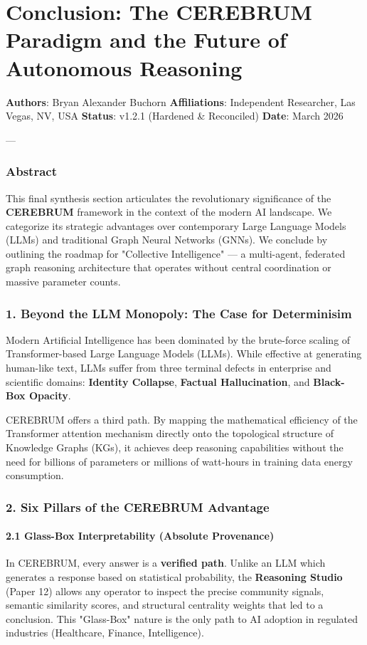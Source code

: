 \section{Conclusion: The CEREBRUM Paradigm and the Future of Autonomous Reasoning}

\textbf{Authors}: Bryan Alexander Buchorn  
\textbf{Affili\-ations}: Independent Researcher, Las Vegas, NV, USA  
\textbf{Status}: v1.2.1 (Hardened \& Reconciled)  
\textbf{Date}: March 2026

---

\subsubsection{Abstract}
This final synthesis section articulates the revol\-utionary signi\-ficance of the \textbf{CEREBRUM} framework in the context of the modern AI landscape. We categorize its strategic advantages over conte\-mporary Large Language Models (LLMs) and traditional Graph Neural Networks (GNNs). We conclude by outlining the roadmap for "Collective Intell\-igence" — a multi-agent, federated graph reasoning archi\-tecture that operates without central coord\-ination or massive parameter counts.

\subsubsection{1. Beyond the LLM Monopoly: The Case for Determ\-inisim}
Modern Artificial Intell\-igence has been dominated by the brute-force scaling of Transformer-based Large Language Models (LLMs). While effective at generating human-like text, LLMs suffer from three terminal defects in enterprise and scientific domains: \textbf{Identity Collapse}, \textbf{Factual Halluc\-ination}, and \textbf{Black-Box Opacity}. 

CEREBRUM offers a third path. By mapping the mathe\-matical efficiency of the Transformer attention mechanism directly onto the topological structure of Knowledge Graphs (KGs), it achieves deep reasoning capab\-ilities without the need for billions of parameters or millions of watt-hours in training data energy consumption.

\subsubsection{2. Six Pillars of the CEREBRUM Advantage}

\paragraph{2.1 Glass-Box Interp\-retability (Absolute Provenance)}
In CEREBRUM, every answer is a \textbf{verified path}. Unlike an LLM which generates a response based on statistical probability, the \textbf{Reasoning Studio} (Paper 12) allows any operator to inspect the precise community signals, semantic similarity scores, and structural centrality weights that led to a conclusion. This "Glass-Box" nature is the only path to AI adoption in regulated industries (Healthcare, Finance, Intell\-igence).

